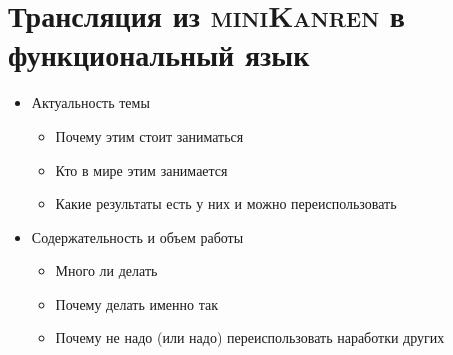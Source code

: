 \documentclass{article}
\newcommand{\miniKanren}{\textsc{miniKanren }}
\begin{document}
\section{Трансляция из \miniKanren в функциональный язык}


\begin{itemize}
    \item Актуальность темы
    \begin{itemize}
        \item Почему этим стоит заниматься
        \item Кто в мире этим занимается
        \item Какие результаты есть у них и можно переиспользовать
    \end{itemize}
    \item Содержательность и объем работы
    \begin{itemize}
        \item Много ли делать 
        \item Почему делать именно так 
        \item Почему не надо (или надо) переиспользовать наработки других
    \end{itemize}
\end{itemize}
\end{document}
